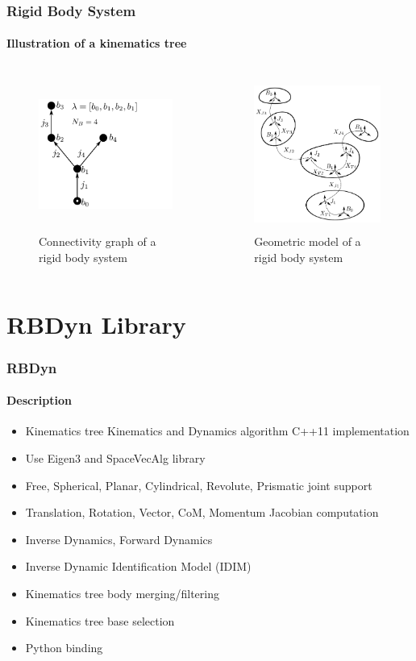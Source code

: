\documentclass{beamer}
\begin{document}
\begin{frame}
\frametitle{Rigid Body System}
\framesubtitle{Illustration of a kinematics tree}
\begin{columns}[T]
	\begin{column}[T]{5cm}
		\begin{figure}
			\includegraphics[height=5cm]{img/robot1_graph.pdf}
			\caption{Connectivity graph of a rigid body system}
		\end{figure}
	\end{column}
	\begin{column}[T]{5cm}
		\begin{figure}
			\includegraphics[height=5cm]{img/robot1_illu.pdf}
			\caption{Geometric model of a rigid body system}
		\end{figure}
	\end{column}
	 \end{columns}
\end{frame}



\section{RBDyn Library}
\begin{frame}
\frametitle{RBDyn}
\framesubtitle{Description}
\begin{itemize}
	\item Kinematics tree Kinematics and Dynamics algorithm C++11 implementation
	\item Use Eigen3 and SpaceVecAlg library
	\item Free, Spherical, Planar, Cylindrical, Revolute, Prismatic joint support
	\item Translation, Rotation, Vector, CoM, Momentum Jacobian computation
	\item Inverse Dynamics, Forward Dynamics
	\item Inverse Dynamic Identification Model (IDIM)
	\item Kinematics tree body merging/filtering
	\item Kinematics tree base selection
	\item Python binding
\end{itemize}
\end{frame}
\end{document}
